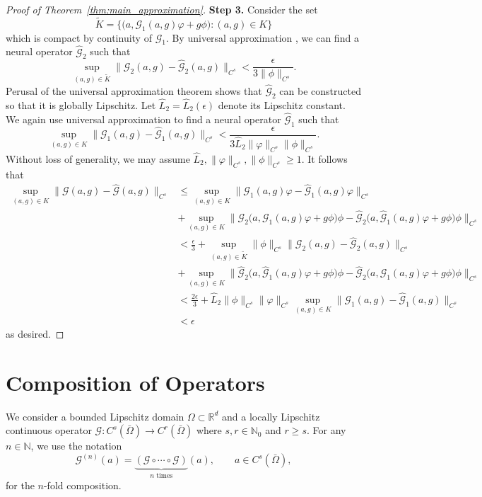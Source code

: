 \documentclass[preprint,11pt]{elsarticle}
\theoremstyle{plain}
\newcommand{\R}{\mathbb{R}}
\newcommand{\N}{\mathbb{N}}
\newcommand{\G}{\mathcal{G}}
\begin{document}
\begin{proof}[Proof of Theorem~\ref{thm:main_approximation}]
    \textbf{Step 3.} Consider the set 
    \[\tilde{K} =  \big \{ \big ( a, \G_1 (a,g) \varphi + g \phi \big ) : (a,g) \in K \big \}\]
    which is compact by continuity of $\G_1$. By universal approximation \cite{kovachki2023neural, lanthaler2023nonlocality}, we can find a neural operator $\hat{\G}_2$ such that
    \[\sup_{(a,g) \in \tilde{K}} \|\G_2(a,g) - \hat{\G}_2(a,g)\|_{C^s} < \frac{\epsilon}{3\|\phi\|_{C^s}}.\]
    Perusal of the universal approximation theorem shows that $\hat{\G}_2$ can be constructed so that it is globally Lipschitz. Let $\hat{L}_2 = \hat{L}_2(\epsilon)$ denote its Lipschitz constant.  We again use universal approximation to find a neural operator $\hat{\G}_1$ such that
    \[\sup_{(a,g) \in K} \|\G_1(a,g) - \hat{\G}_1(a,g) \|_{C^s} < \frac{\epsilon}{3\hat{L}_2\|\varphi\|_{C^s} \|\phi\|_{C^s}}.\]
    Without loss of generality, we may assume $\hat{L}_2, \|\varphi\|_{C^s}, \|\phi\|_{C^s} \geq 1$. It follows that
    \begin{align*}
        \sup_{(a,g) \in K} \|\G(a,g) - \hat{\G}(a,g)\|_{C^s} &\leq \sup_{(a,g) \in K} \|\G_1(a,g) \varphi - \hat{\G}_1(a,g) \varphi \|_{C^s} \\
        &+ \sup_{(a,g) \in K} \|\G_2 \big( a, \G_1(a,g) \varphi + g \phi \big ) \phi - \hat{\G}_2 \big ( a, \hat{\G}_1 (a,g) \varphi + g \phi \big ) \phi \|_{C^s} \\
        &< \frac{\epsilon}{3} + \sup_{(a,g) \in \tilde{K}} \|\phi\|_{C^s} \|\G_2(a,g) - \hat{\G}_2(a,g)\|_{C^s} \\
        &+ \sup_{(a,g) \in K} \|\hat{\G}_2 \big ( a, \hat{\G}_1(a,g)\varphi + g \phi \big ) \phi - \hat{\G}_2 \big ( a, \G_1 (a,g) \varphi + g \phi \big ) \phi \|_{C^s}  \\
        &< \frac{2 \epsilon}{3} + \hat{L}_2 \|\phi\|_{C^s} \|\varphi\|_{C^s} \sup_{(a,g) \in K} \|\G_1(a,g) - \hat{\G}_1(a,g) \|_{C^s} \\
        &< \epsilon
    \end{align*}
    as desired.
\end{proof}

\section{Composition of Operators}
\label{sec:compisiton_of_operators}

We consider a bounded Lipschitz domain $\Omega \subset \R^d$ and a locally Lipschitz continuous operator $\G : C^s (\bar{\Omega}) \to C^r (\bar{\Omega})$ where $s,r \in \N_0$ and $r \geq s$. For any \(n \in \N\), we use the notation
\[\G^{(n)}(a) = \underbrace{(\G \circ \cdots \circ \G)}_{n \text{ times}}(a), \qquad a \in C^s(\bar{\Omega}),\]
for the $n$-fold composition.
\end{document}
